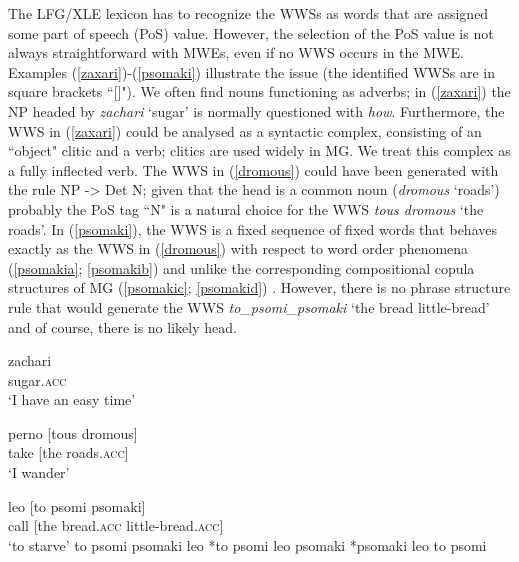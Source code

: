 \documentclass[output=paper,
modfonts
]{langscibook}
\begin{document}
The LFG/XLE lexicon has to recognize the WWSs as words that are assigned some part of speech (PoS) value. However, the selection of the PoS value is not always straightforward with MWEs, even if no WWS occurs in the MWE. Examples (\ref{zaxari})-(\ref{psomaki}) illustrate the issue (the identified WWSs are in square brackets ``[]"). We often find nouns functioning as adverbs; in (\ref{zaxari}) the NP headed by \textit{zachari} `sugar' is normally questioned with \textit{how}. Furthermore, the WWS in (\ref{zaxari}) could be analysed as a syntactic complex, consisting of an  ``object" clitic and a verb; clitics are used widely in MG.  We treat this complex as a fully inflected verb. The WWS in (\ref{dromous}) could have been generated with the rule NP -> Det  N; given that the head is a common noun (\textit{dromous} `roads') probably the PoS tag ``N" is a natural choice for the WWS \textit{tous dromous} `the roads'. In (\ref{psomaki}), the WWS is a fixed sequence of fixed words that behaves exactly as the WWS in (\ref{dromous})  with respect to word order phenomena (\ref{psomakia}; \ref{psomakib}) and unlike the corresponding compositional copula structures of MG (\ref{psomakic}; \ref{psomakid}) . However, there is no phrase structure rule that would generate the WWS \textit{to\_psomi\_psomaki} `the bread little-bread' and of course, there is no likely head. 

\ea\label{zaxari}
   zachari\\
[her.\textsc{acc}.\textsc{fem}   pass.\textsc{1st}]     sugar.\textsc{acc}\\
\glt `I have an easy time’
\z

\ea\label{dromous}
\gll perno [tous dromous]\\
take    [the  roads.\textsc{acc}] \\
\glt      `I wander’
\z

\begin{exe}
\ex \label{psomaki}
\begin{xlist}
\settowidth{}
\ex \label{psomakia}
\gll leo [to  psomi  psomaki] \\
 call [the bread.\textsc{acc}  little-bread.\textsc{acc}]\\
 \glt `to starve’
\ex \label{psomakib}
to psomi psomaki leo 
\ex \label{psomakic}
*to psomi leo psomaki 
\ex \label{psomakid}
*psomaki leo to psomi 
\end{xlist}
\end{exe}
\end{document}
